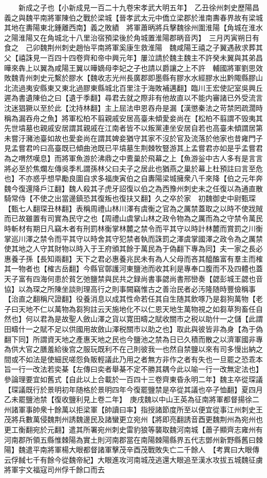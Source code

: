 　　新成之子也【小新成見一百二十九卷宋孝武大明五年】　乙丑徐州刺史歷陽昌義之與魏平南將軍陳伯之戰於梁城【晉孝武太元中僑立梁郡於淮南夀春界故有梁城其地在夀陽東北鍾離西南】義之敗績　將軍蕭昞將兵擊魏徐州圍淮陽【角城在淮水之陽淮陽又在角城北十八里治宿預梁後於角城置淮陽郡昞音丙】　三月丙寅朔日有食之　己卯魏荆州刺史趙怡平南將軍奚康生救淮陽　魏咸陽王禧之子翼遇赦求葬其父【禧誅見一百四十四卷齊和帝中興元年】屢泣請於魏主魏主不許癸未翼與其弟昌曄來犇上以翼為咸陽王翼以曄嫡母李妃之子也請以爵讓之上不許　輔國將軍劉思效敗魏青州刺史元繫於膠水【魏收志光州長廣郡即墨縣有膠水水經膠水出黔陬縣膠山北流過夷安縣東又東北過膠東縣城北百里注于海敗補邁翻】臨川王宏使記室吳興丘遲為書遺陳伯之曰【遺于季翻】尋君去就之際非有他故直以不能内審諸已外受流言沈迷猖獗以至於此【沈持林翻】主上屈法申恩吞舟是漏【漢懲秦法之苛禁罔疏濶時稱為漏吞舟之魚】將軍松柏不翦親戚安居高臺未傾愛妾尚在【松柏不翦謂不毁夷其先世墳墓也親戚安居謂其親戚在江南者皆不以叛黨連坐安居自若也高臺未傾謂居第未嘗汙瀦池臺如故也愛妾尚在謂其婢妾猶守其家不沒於官及流落於他家也昔雍門子見孟嘗君吟曰高臺既已傾曲池既已平墳墓生荆棘牧豎游其上孟嘗君亦如是乎孟嘗君為之喟然嘆息】而將軍魚游於沸鼎之中鷰巢於飛幕之上【魚游釡中古人多有是言言將必至於焦爛左傳吳季札謂孫林父曰夫子之居此也猶燕之巢於幕上杜預註曰言至危也】不亦惑乎想早勵良圖自求多福庚寅伯之自夀陽梁城擁衆八千來降【伯之元年奔魏今復還降戶江翻】魏人殺其子虎牙詔復以伯之為西豫州刺史未之任復以為通直散騎常侍【不使之出當邊鎮恐其復叛也復扶又翻】久之卒於家　初魏御史中尉甄琛【甄七人翻琛丑林翻】表稱周禮山林川澤有虞衡之官為之厲禁蓋取之以時不使戕賊而已故雖置有司實為民守之也【周禮山虞掌山林之政令物為之厲而為之守禁令萬民時斬材有期日凡竊木者有刑罰林衡掌林麓之禁令而平其守以時計林麓而賞罰之川衡掌巡川澤之禁令而平其守以時舍其守犯禁者執而誅罰之澤虞掌國澤之政令為之厲禁使其地之人守其財物以時入于王府頒其餘于萬民為于偽翻下專為同】夫一家之長必惠養子孫【長知兩翻】天下之君必惠養兆民未有為人父母而吝其醯醢富有羣主而榷其一物者也【榷古岳翻】今縣官鄣護河東鹽池而收其利是專奉口腹而不及四體也蓋天子富有四海何患於貧乞弛鹽禁與民共之録尚書事勰尚書邢巒奏【勰彭城王勰也音協】以為琛之所陳坐談則理高行之則事闕竊惟古之善治民者必汚隆随時豐儉稱事【治直之翻稱尺證翻】役養消息以成其性命若任其自生随其飲啄乃是芻狗萬物【老子曰天地不仁以萬物為芻狗註云天施地化不以仁恩天地生萬物視之如芻草狗畜任自然也】何以君為是故聖人斂山澤之貨以寛田疇之賦收關市之税以助什一之儲【此謂田疇什一之賦不足以供國用故斂山澤税關市以助之也】取此與彼皆非為身【為于偽翻下同】所謂資天地之產惠天地之民也今鹽池之禁為日已久積而散之以濟軍國非專為供大官之膳羞給後宫之服玩既利不在己則彼我一也然自禁鹽以來有司多慢出納之間或不如法是使細民嗟怨負販輕議此乃用之者無方非作之者有失也一旦罷之恐乖本旨一行一改法若奕棊【左傳曰奕者舉棊不定不勝其耦今此以喻一行一改無定法也】參論理要宜如舊式【自此以上合載於一百四十三卷齊東昏永明二年】魏主卒從琛議【琛議既行於景明初年随格於景明四年今復罷鹽禁是卒從其議也卒子恤翻】夏四月乙未罷鹽池禁【復收鹽利見上卷二年】　庚戌魏以中山王英為征南將軍都督揚徐二州諸軍事帥衆十餘萬以拒梁軍【帥讀曰率】指授諸節度所至以便宜從事江州刺史王茂將兵數萬侵魏荆州誘魏邊民及諸蠻更立宛州【將即亮翻誘音酉更魏荆州為宛州也更工衡翻宛於元翻】遣其所署宛州刺史雷豹狼等襲取魏河南城【蕭子顯齊志雍州有河南郡所領五縣惟棘陽為實土則河南郡當在南陽棘陽縣界五代志鄧州新野縣舊曰棘陽】魏遣平南將軍楊大眼都督諸軍擊茂辛酉茂戰敗失亡二千餘人　【考異曰大眼傳云俘馘七千有餘今從魏帝紀】大眼進攻河南城茂逃還大眼追至漢水攻拔五城魏征虜將軍宇文福寇司州俘千餘口而去